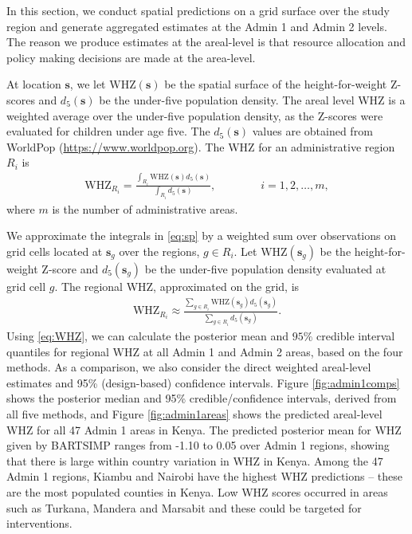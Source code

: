 \documentclass[preprint,12pt,authoryear]{elsarticle}
\begin{document}
{In this section, we conduct spatial predictions on a grid surface over the study region and generate aggregated estimates at the Admin 1 and Admin 2 levels.
 The reason we produce estimates at the areal-level is that resource allocation and policy making decisions are made at the area-level.

At location $\boldsymbol{s}$, we let $\text{WHZ}(\boldsymbol{s})$ be the spatial surface of the height-for-weight Z-scores and $d_{5}(\boldsymbol{s})$ be the under-five population density. The areal level WHZ is a weighted average over the under-five population density, as the Z-scores were evaluated for children under age five. The  $d_5(\boldsymbol{s})$ values are obtained from WorldPop (\url{https://www.worldpop.org}). The WHZ for an administrative region $R_i$ is 
\begin{align}
\label{eq:sp}
	\text{WHZ}_{R_i} = \frac{\int_{R_i} \text{WHZ}(\boldsymbol{s}) d_5(\boldsymbol{s})}{\int_{R_i}  d_5(\boldsymbol{s})}, \qquad \qquad i = 1,2, \dots, m,
\end{align}
where $m$ is the number of administrative areas.

We approximate the integrals in \eqref{eq:sp} by a weighted sum over observations on grid cells located at $\boldsymbol{s}_g$ over the regions, $g \in R_i$. Let $\text{WHZ}(\boldsymbol{s}_g)$ be the height-for-weight Z-score and $d_5(\boldsymbol{s}_g)$ be the under-five population density evaluated at grid cell $g$. The regional WHZ, approximated on the grid, is
\begin{align}
\label{eq:WHZ}
	{\text{WHZ}}_{R_i} \approx  \frac{\sum_{g \in R_i} {\text{WHZ}}(\boldsymbol{s}_g) d_5(\boldsymbol{s}_g) }{\sum_{g \in R_i} d_5(\boldsymbol{s}_g)}.
\end{align}
Using \eqref{eq:WHZ}, we can calculate the posterior mean and $95\%$ credible interval quantiles for regional ${\text{WHZ}}$ at all Admin 1 and Admin 2 areas, based on the four methods. As a comparison, we also consider the direct weighted areal-level estimates and 95\% (design-based) confidence intervals. Figure \ref{fig:admin1comps} shows the posterior median and 95\% credible/confidence intervals, derived from all five methods, and Figure \ref{fig:admin1areas} shows the predicted areal-level WHZ for all 47 Admin 1 areas in Kenya. The predicted posterior mean for WHZ given by BARTSIMP ranges from -1.10 to 0.05 over Admin 1 regions, showing that there is large within country variation in WHZ in Kenya. Among the 47 Admin 1 regions, Kiambu and Nairobi have the highest WHZ predictions -- these are the most populated counties in Kenya. Low WHZ scores occurred in areas such as Turkana, Mandera and Marsabit and these could be targeted for interventions. 

}
\end{document}

